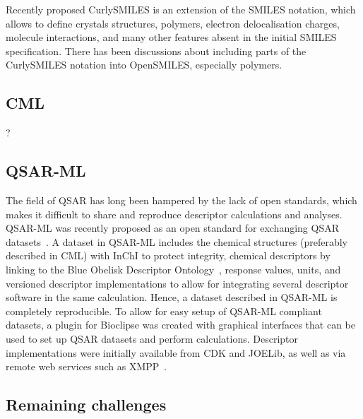 \documentclass[10pt]{bmc_article}
\newenvironment{bmcformat}{\fussy\setboolean{publ}{true}}{\fussy}
\begin{document}
\begin{bmcformat}
Recently proposed CurlySMILES\cite{CurlySMILES} is an extension of the
SMILES notation, which allows to define crystals structures, polymers,
electron delocalisation charges, molecule interactions, and many other
features absent in the initial SMILES specification. There has been
discussions about including parts of the CurlySMILES notation into
OpenSMILES, especially polymers.

\subsection*{CML}
?

\subsection*{QSAR-ML}
The field of QSAR has long been hampered by the lack of open standards, which makes it difficult to share and reproduce descriptor calculations and analyses. QSAR-ML was recently proposed as an open standard for exchanging QSAR datasets~\cite{Spjuth:2010uq}. A dataset in QSAR-ML includes the chemical structures (preferably described in CML) with InChI to protect integrity, chemical descriptors by linking to the Blue Obelisk Descriptor Ontology~\cite{bodo}, response values, units, and versioned descriptor implementations to allow for integrating several descriptor software in the same calculation. Hence, a dataset described in QSAR-ML is completely reproducible. To allow for easy setup of QSAR-ML compliant datasets, a plugin for Bioclipse was created with graphical interfaces that can be used to set up QSAR datasets and perform calculations. Descriptor implementations were initially available from CDK and JOELib, as well as via remote web services such as XMPP~\cite{Wagener:2009uq}.

\subsection*{Remaining challenges}


\end{bmcformat}
\end{document}
